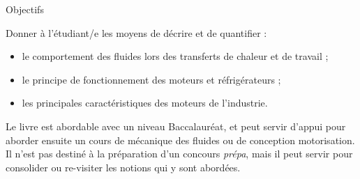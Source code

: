\thispagestyle{empty}



	\vspace{-0.5cm}
	{\center \normalsize \huge Objectifs\par}
	\vspace{0.5cm}

	Donner à l’étudiant/e les moyens de décrire et de quantifier :
	\begin{itemize}
		\item le comportement des fluides lors des transferts de chaleur et de travail ;
		\item le principe de fonctionnement des moteurs et réfrigérateurs ;
		\item les principales caractéristiques des moteurs de l’industrie.
	\end{itemize}

	Le livre est abordable avec un niveau Baccalauréat, et peut servir d’appui pour aborder ensuite un cours de mécanique des fluides ou de conception motorisation. Il n’est pas destiné à la préparation d’un concours \textit{prépa}, mais il peut servir pour consolider ou re-visiter les notions qui y sont abordées.

	\vspace{0.3cm}


\restoregeometry
\pagestyle{fancy}




